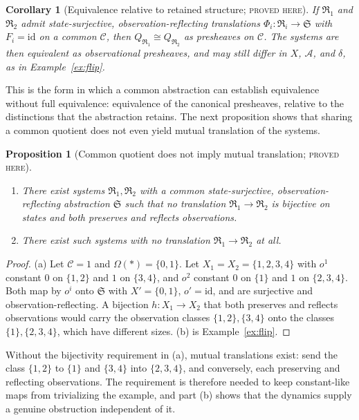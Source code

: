 \documentclass[11pt]{article}
\newtheorem{proposition}[theorem]{Proposition}
\newtheorem{corollary}[theorem]{Corollary}
\theoremstyle{definition}
\theoremstyle{remark}
\newcommand{\stN}{\textsc{proved here}}
\newcommand{\cC}{\mathcal C}
\newcommand{\cA}{\mathcal A}
\newcommand{\fR}{\mathfrak R}
\newcommand{\fS}{\mathfrak S}
\newcommand{\id}{\mathrm{id}}
\begin{document}
\begin{corollary}[Equivalence relative to retained structure; \stN]\label{cor:relequiv}
If $\fR_1$ and $\fR_2$ admit state-surjective, observation-reflecting translations $\Phi_i:\fR_i\to\fS$ with $F_i=\id$ on a common $\cC$, then $Q_{\fR_1}\cong Q_{\fR_2}$ as presheaves on $\cC$. The systems are then equivalent as observational presheaves, and may still differ in $X$, $\cA$, and $\delta$, as in Example~\ref{ex:flip}.
\end{corollary}

This is the form in which a common abstraction can establish equivalence without full equivalence: equivalence of the canonical presheaves, relative to the distinctions that the abstraction retains. The next proposition shows that sharing a common quotient does not even yield mutual translation of the systems.

\begin{proposition}[Common quotient does not imply mutual translation; \stN]\label{prop:commonquot}
\begin{enumerate}[label=(\alph*)]
\item There exist systems $\fR_1,\fR_2$ with a common state-surjective, observation-reflecting abstraction $\fS$ such that no translation $\fR_1\to\fR_2$ is bijective on states and both preserves and reflects observations.
\item There exist such systems with no translation $\fR_1\to\fR_2$ at all.
\end{enumerate}
\end{proposition}
\begin{proof}
(a) Let $\cC=1$ and $\Omega(\ast)=\{0,1\}$. Let $X_1=X_2=\{1,2,3,4\}$ with $o^1$ constant $0$ on $\{1,2\}$ and $1$ on $\{3,4\}$, and $o^2$ constant $0$ on $\{1\}$ and $1$ on $\{2,3,4\}$. Both map by $o^i$ onto $\fS$ with $X'=\{0,1\}$, $o'=\id$, and are surjective and observation-reflecting. A bijection $h:X_1\to X_2$ that both preserves and reflects observations would carry the observation classes $\{1,2\},\{3,4\}$ onto the classes $\{1\},\{2,3,4\}$, which have different sizes. (b) is Example~\ref{ex:flip}.
\end{proof}

Without the bijectivity requirement in (a), mutual translations exist: send the class $\{1,2\}$ to $\{1\}$ and $\{3,4\}$ into $\{2,3,4\}$, and conversely, each preserving and reflecting observations. The requirement is therefore needed to keep constant-like maps from trivializing the example, and part (b) shows that the dynamics supply a genuine obstruction independent of it.
\end{document}
